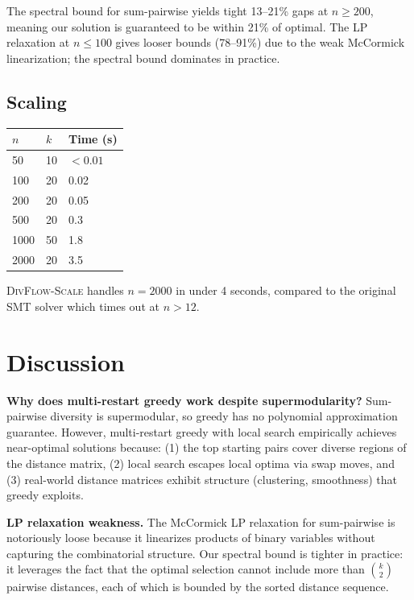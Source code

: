 \documentclass[11pt,a4paper]{article}
\begin{document}
The spectral bound for sum-pairwise yields tight 13--21\% gaps at $n \geq 200$, meaning our solution is guaranteed to be within 21\% of optimal. The LP relaxation at $n \leq 100$ gives looser bounds (78--91\%) due to the weak McCormick linearization; the spectral bound dominates in practice.

\subsection{Scaling}

\begin{center}
\begin{tabular}{lll}
\toprule
$n$ & $k$ & \textbf{Time (s)} \\
\midrule
50 & 10 & $< 0.01$ \\
100 & 20 & 0.02 \\
200 & 20 & 0.05 \\
500 & 20 & 0.3 \\
1000 & 50 & 1.8 \\
2000 & 20 & 3.5 \\
\bottomrule
\end{tabular}
\end{center}

\textsc{DivFlow-Scale} handles $n = 2000$ in under 4 seconds, compared to the original SMT solver which times out at $n > 12$.

\section{Discussion}

\textbf{Why does multi-restart greedy work despite supermodularity?} Sum-pairwise diversity is supermodular, so greedy has no polynomial approximation guarantee. However, multi-restart greedy with local search empirically achieves near-optimal solutions because: (1) the top starting pairs cover diverse regions of the distance matrix, (2) local search escapes local optima via swap moves, and (3) real-world distance matrices exhibit structure (clustering, smoothness) that greedy exploits.

\textbf{LP relaxation weakness.} The McCormick LP relaxation for sum-pairwise is notoriously loose because it linearizes products of binary variables without capturing the combinatorial structure. Our spectral bound is tighter in practice: it leverages the fact that the optimal selection cannot include more than $\binom{k}{2}$ pairwise distances, each of which is bounded by the sorted distance sequence.
\end{document}
